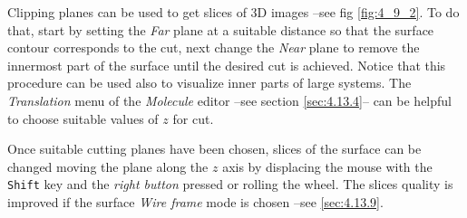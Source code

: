 \documentclass[10pt]{article}
\begin{document}
Clipping planes can be used to get slices of 3D images --see fig 
\ref{fig:4_9_2}. To do that, start by setting the {\it Far} plane at a 
suitable distance so that 
the surface contour corresponds to the cut, next change the {\it Near} plane 
to remove the 
innermost part of the surface 
until the desired cut is achieved.
Notice that this procedure can be used also to visualize inner parts of 
large systems.
The {\it Translation} menu of the {\it Molecule} editor --see section \ref{sec:4.13.4}--
can be helpful to choose suitable values of $z$ for cut. 

Once suitable cutting planes have been chosen, slices of the surface can be 
changed moving the plane along the $z$ axis by displacing the mouse 
with the \texttt{Shift} key and the {\it right button} pressed or rolling 
the wheel. 
The slices quality is improved if
the surface {\it Wire frame} mode is chosen --see \ref{sec:4.13.9}. 
\end{document}
